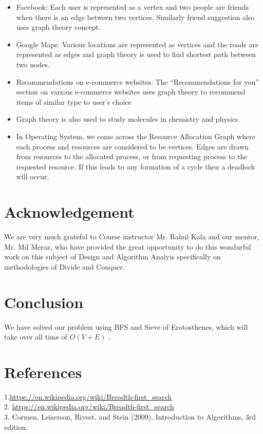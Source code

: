 \documentclass[conference]{IEEEtran}
\begin{document}
\begin{itemize}
    \item Facebook: Each user is represented as a vertex and two people are friends when there is an edge between two vertices. Similarly friend suggestion also uses graph theory concept.
     \item Google Maps: Various locations are represented as vertices and the roads are represented as edges and graph theory is used to find shortest path between two nodes.
\item Recommendations on e-commerce websites: The “Recommendations for you” section on various e-commerce websites uses graph theory to recommend items of similar type to user’s choice
\item Graph theory is also used to study molecules in chemistry and physics.
\item In Operating System, we come across the Resource Allocation Graph where each process and resources are considered to be vertices. Edges are drawn from resources to the allocated process, or from requesting process to the requested resource. If this leads to any formation of a cycle then a deadlock will occur.
\end{itemize}


\section{Acknowledgement}
We are very much grateful to Course instructor Mr. Rahul Kala and our mentor, Mr. Md Meraz, who have provided the great opportunity to do this wondurful work on this subject of Design and Algorithm Analyis specifically on methodologies of Divide and Conquer.

\section{Conclusion}
We have solved our problem using BFS and Sieve of Eratosthenes,
which will take over all time of $O(V+E)$ .

 \section{References}
\color{blue}1.{\url{https://en.wikipedia.org/wiki/Breadth-first_search} }\\
2. {\url{https://en.wikipedia.org/wiki/Breadth-first_search}}\\
3. Cormen, Leiserson, Rivest, and Stein (2009). Introduction to Algorithms, 3rd edition.
\end{document}
